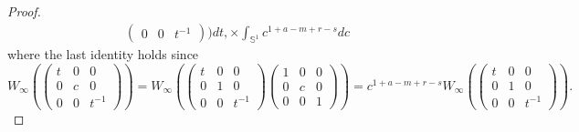 \documentclass[11pt, a4paper]{amsart}
\theoremstyle{plain}
\theoremstyle{definition}
\numberwithin{equation}{section}
\begin{document}
\begin{proof}
\begin{align}
\begin{pmatrix}
                                                                                                    0 & 0 & t^{-1} 
                                                                                                  \end{pmatrix}) dt, 
         \times \int_{\mathbb{S}^{1}} c^{1 + a - m + r - s} dc                                                                                                                                                                      
    \end{align}
    where the last identity holds since
    \begin{equation*}
        W_{\infty}(\begin{pmatrix}
                     t & 0 & 0 \\
                     0 & c & 0 \\
                     0 & 0 & t^{-1} 
                    \end{pmatrix}) =  W_{\infty}(\begin{pmatrix}
                                                     t & 0 & 0 \\
                                                     0 & 1 & 0 \\
                                                     0 & 0 & t^{-1} 
                                                  \end{pmatrix} \begin{pmatrix}
                                                                     1 & 0 & 0 \\
                                                                     0 & c & 0 \\
                                                                     0 & 0 & 1
                                                                \end{pmatrix}) = c^{1 + a - m + r - s} W_{\infty}(\begin{pmatrix}
                                                                                                                     t & 0 & 0 \\
                                                                                                                     0 & 1 & 0 \\
                                                                                                                     0 & 0 & t^{-1} 
                                                                                                                    \end{pmatrix}). 

\end{equation*}
\end{proof}
\end{document}
